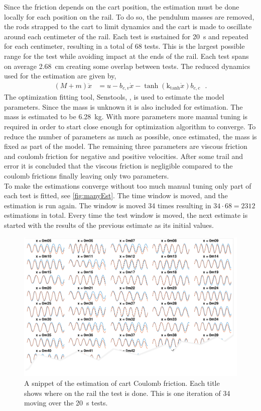 Since the friction depends on the cart position, the estimation must be done locally for each position on the rail. To do so, the pendulum masses are removed, the rods strapped to the cart to limit dynamics and the cart is made to oscillate around each centimeter of the rail. Each test is sustained for \SI{20}{s} and repeated for each centimeter, resulting in a total of 68 tests. This is the largest possible range for the test while avoiding impact at the ends of the rail. Each test spans on average \SI{2.68}{cm} creating some overlap between tests. The reduced dynamics used for the estimation are given by,
\begin{align}
  ( M + m )\ddot{x} &=  u - b_{c,v} \dot{x} - \tanh(\text{k}_\text{tanh}\dot{x}) b_{c,c} \ \ \ .
  \label{eq:reducedForCartEstimation}
\end{align}
%
The optimization fitting tool, Senstools, \cite{MHKnudsen}, is used to estimate the model parameters. Since the mass is unknown it is also included for estimation. The mass is estimated to be \SI{6.28}{kg}. With more parameters more manual tuning is required in order to start close enough for optimization algorithm to converge. To reduce the number of parameters as much as possible, once estimated, the mass is fixed as part of the model. The remaining three parameters are viscous friction and coulomb friction for negative and positive velocities. After some trail and error it is concluded that the viscous friction is negligible compared to the coulomb frictions finally leaving only two parameters.\\
To make the estimations converge without too much manual tuning only part of each test is fitted, see \autoref{fig:manyEst}. The time window is moved, and the estimation is run again. The window is moved \num{34} times resulting in $34\cdot68 = 2312$ estimations in total. Every time the test window is moved, the next estimate is started with the results of the previous estimate as its initial values.
%
\begin{figure}[H]
  \includegraphics[width=.6\textwidth]{figures/manyEst_tear}
  \caption{A snippet of the estimation of cart Coulomb friction. Each title shows where on the rail the test is done. This is one iteration of 34 moving over the \SI{20}{s} tests.}
  \label{fig:manyEst}
\end{figure}
